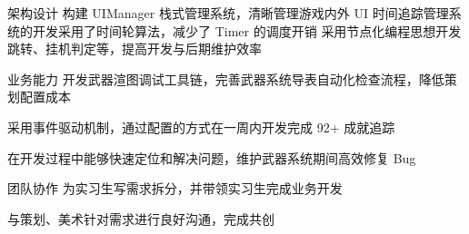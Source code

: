 

\begin{cvskills}

    \cvskill
        {架构设计} %
        {构建 ​​UIManager 栈式管理系统​​，清晰管理游戏内外 UI} %
    \cvskill
        {} %
        {时间追踪管理系统的开发采用了时间轮算法，减少了 Timer 的调度开销} %
    \cvskill
        {} %
        {采用节点化编程思想开发跳转、挂机判定等，提高开发与后期维护效率} %

    \cvskill
        {​业务能力} %
        {开发武器渲图调试工具链，完善武器系统导表自动化检查流程，降低策划配置成本} %

    \cvskill
        {} %
        {采用事件驱动机制，通过配置的方式在一周内开发完成 92+ 成就追踪} %

    \cvskill
        {} %
        {在开发过程中能够快速定位和解决问题，维护武器系统期间高效修复 Bug} %


    \cvskill
        {团队协作} %
        {为实习生写需求拆分，并带领实习生完成业务开发} %

    \cvskill
        {} %
        {与策划、美术针对需求进行良好沟通，完成共创} %


\end{cvskills}
